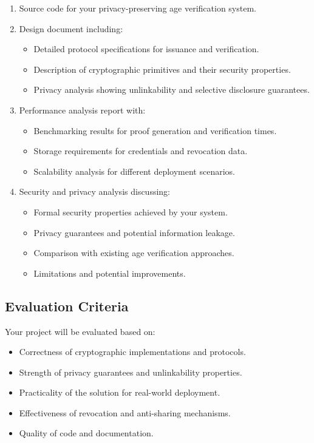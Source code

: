 \documentclass[10pt,a4paper,american]{exam}
\begin{document}
\begin{enumerate}
	\item Source code for your privacy-preserving age verification system.
	\item Design document including:
	      \begin{itemize}
		      \item Detailed protocol specifications for issuance and verification.
		      \item Description of cryptographic primitives and their security properties.
		      \item Privacy analysis showing unlinkability and selective disclosure guarantees.
	      \end{itemize}
	\item Performance analysis report with:
	      \begin{itemize}
		      \item Benchmarking results for proof generation and verification times.
		      \item Storage requirements for credentials and revocation data.
		      \item Scalability analysis for different deployment scenarios.
	      \end{itemize}
	\item Security and privacy analysis discussing:
	      \begin{itemize}
		      \item Formal security properties achieved by your system.
		      \item Privacy guarantees and potential information leakage.
		      \item Comparison with existing age verification approaches.
		      \item Limitations and potential improvements.
	      \end{itemize}
\end{enumerate}

\subsection*{Evaluation Criteria}
Your project will be evaluated based on:

\begin{itemize}
	\item Correctness of cryptographic implementations and protocols.
	\item Strength of privacy guarantees and unlinkability properties.
	\item Practicality of the solution for real-world deployment.
	\item Effectiveness of revocation and anti-sharing mechanisms.
	\item Quality of code and documentation.
\end{itemize}
\end{document}
